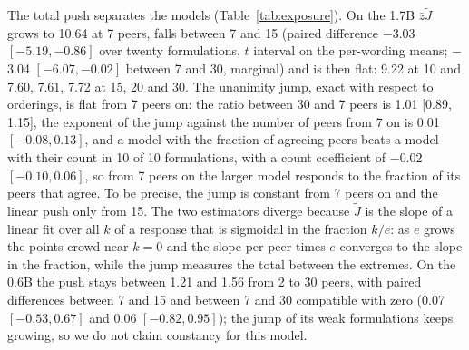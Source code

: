 \documentclass[11pt]{article}
\begin{document}
The total push separates the models (Table~\ref{tab:exposure}). On the 1.7B
$\bar z\tilde J$ grows to 10.64 at 7 peers, falls between 7 and 15
(paired difference $-$3.03 $[-5.19, -0.86]$ over twenty formulations, $t$
interval on the per-wording means; $-$3.04 $[-6.07, -0.02]$ between 7 and 30, marginal) and is then
flat: 9.22 at 10 and 7.60, 7.61, 7.72 at 15, 20 and 30. The unanimity jump,
exact with respect to orderings, is flat from 7 peers on: the ratio between
30 and 7 peers is 1.01 [0.89, 1.15], the exponent
of the jump against the number of peers from 7 on is 0.01 $[-0.08, 0.13]$,
and a model with the fraction of agreeing peers beats a model with their
count in 10 of 10 formulations, with a count coefficient of $-0.02$
$[-0.10, 0.06]$, so from 7 peers on the larger model responds to the fraction of its peers that agree. To be precise, the jump is constant from 7 peers on and the linear push only from 15. The two estimators diverge because
$\tilde J$ is the slope of a linear fit over all $k$ of a response that is
sigmoidal in the fraction $k/e$: as $e$ grows the points crowd near $k=0$
and the slope per peer times $e$ converges to the slope in the fraction,
while the jump measures the total between the extremes. On the 0.6B the
push stays between 1.21 and 1.56 from 2 to 30 peers, with paired
differences between 7 and 15 and between 7 and 30 compatible with zero
(0.07 $[-0.53, 0.67]$ and 0.06 $[-0.82, 0.95]$); the jump of its weak
formulations keeps growing, so we do not claim constancy for this model.

\begin{table}[htbp]
\centering
\caption{Total push and mean-field criterion by exposure, ten
formulations per cell; 32 orderings from 7 peers on. Ceiling
$\mathbb{E}_0|k|$ of $F'(0)$ and mean ratio to it (in brackets, the
formulations within 0.01 of the ceiling); classes from the ordering
interval of $F'(0)$ on the symmetrised map (ordered / disordered /
undetermined) and from the fixed points of the sector-A map (bistable /
field-dominated / disordered; on the 32-ordering tables from 7 peers on). $^{*}$bfloat16 error propagated; one formulation marginal by construction (copy of the first peer). $^{\dagger}$one of the four bistable formulations is that same copy of the first peer, whose map is the identity: 3 + 1 marginal. $^{\ddagger}$one of the nine disordered formulations is within 0.02 of 1.}
\label{tab:exposure}
\small

\end{table}
\end{document}
